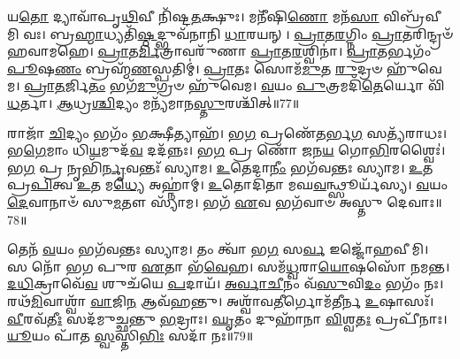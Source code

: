 𑌯\-\ul{𑌤𑍋} 𑌦𑍍𑌯𑌾𑌵𑌾᳴𑌪𑍃\-\ul{𑌥𑌿}\-𑌵𑍀 𑌨𑌿᳴𑌷𑍍𑌟\-\ul{𑌤}\-𑌕𑍍𑌷𑍁𑌃।
𑌮𑌨𑍀᳴𑌷𑌿\-\ul{𑌣𑍋} 𑌮𑌨᳴\-\ul{𑌸𑌾} 𑌵𑌿𑌬𑍍𑌰᳴𑌵𑍀𑌮𑌿 𑌵𑌃।
𑌬𑍍𑌰\-\ul{𑌹𑍍𑌮𑌾}\-𑌧𑍍𑌯𑌤𑌿᳴\-\ul{𑌷𑍍𑌠}\-𑌦𑍍𑌭𑍁𑌵᳴𑌨𑌾𑌨𑌿 \ul{𑌧𑌾}\-𑌰𑌯𑌨𑍍।
\-\ul{𑌪𑍍𑌰𑌾}\-𑌤\-\ul{𑌰}\-𑌗𑍍𑌨𑌿𑌂 \ul{𑌪𑍍𑌰𑌾}\-𑌤𑌰𑌿𑌨𑍍𑌦𑍍𑌰𑍞᳴ 𑌹𑌵𑌾𑌮𑌹𑍇।
\-\ul{𑌪𑍍𑌰𑌾}\-𑌤\-\ul{𑌰𑍍𑌮𑌿}\-𑌤𑍍𑌰𑌾𑌵𑌰𑍁᳴𑌣𑌾 \ul{𑌪𑍍𑌰𑌾}\-𑌤\-\ul{𑌰}\-𑌶𑍍𑌵𑌿𑌨𑌾॑।
\-\ul{𑌪𑍍𑌰𑌾}\-𑌤𑌰𑍍𑌭𑌗𑌂᳴ \ul{𑌪𑍂}\-𑌷\-\ul{𑌣𑌂} 𑌬𑍍𑌰𑌹𑍍𑌮᳴\-\ul{𑌣}\-𑌸𑍍𑌪𑌤𑌿𑌮𑍍॑।
\-\ul{𑌪𑍍𑌰𑌾}\-𑌤𑌃 𑌸𑍋𑌮᳴\-\ul{𑌮𑍁}\-𑌤 \ul{𑌰𑍁}\-𑌦𑍍𑌰𑍞 𑌹𑍁᳴𑌵𑍇𑌮।
\-\ul{𑌪𑍍𑌰𑌾}\-\-\ul{𑌤}\-𑌰𑍍𑌜𑌿\-\ul{𑌤𑌂} 𑌭𑌗᳴\-\ul{𑌮𑍁}\-𑌗𑍍𑌰𑍞 𑌹𑍁᳴𑌵𑍇𑌮।
\-\ul{𑌵}\-𑌯𑌂 \ul{𑌪𑍁}\-𑌤𑍍𑌰𑌮𑌦𑌿᳴\-\ul{𑌤𑍇}\-𑌰𑍍𑌯𑍋 𑌵𑌿᳴\-\ul{𑌧}\-𑌰𑍍𑌤𑌾।
\-\ul{𑌆}\-𑌧𑍍𑌰\-\ul{𑌶𑍍𑌚𑌿}\-𑌦𑍍𑌯𑌂 𑌮𑌨𑍍𑌯᳴𑌮𑌾𑌨\-\ul{𑌸𑍍𑌤𑍁}\-𑌰𑌶𑍍𑌚𑌿᳴𑌤𑍍॥77॥

𑌰𑌾𑌜𑌾᳴ \ul{𑌚𑌿}\-𑌦𑍍𑌯𑌂 𑌭𑌗𑌂᳴ \ul{𑌭}\-𑌕𑍍𑌷𑍀𑌤𑍍𑌯𑌾𑌹᳴।
𑌭\-\ul{𑌗} 𑌪𑍍𑌰𑌣𑍇᳴\-\ul{𑌤}\-𑌰𑍍𑌭\-\ul{𑌗} 𑌸𑌤𑍍𑌯᳴𑌰𑌾𑌧𑌃।
𑌭\-\ul{𑌗𑍇}\-𑌮𑌾𑌂 𑌧𑌿\-\ul{𑌯}\-𑌮𑍁𑌦᳴\-\ul{𑌵} 𑌦𑌦᳴𑌨𑍍𑌨𑌃।
𑌭\-\ul{𑌗} 𑌪𑍍𑌰 𑌣𑍋᳴ 𑌜𑌨\-\ul{𑌯} 𑌗𑍋\-\ul{𑌭𑌿}\-𑌰𑌶𑍍𑌵𑍈𑌃॑।
𑌭\-\ul{𑌗} 𑌪𑍍𑌰 𑌨𑍃𑌭𑌿᳴\-\ul{𑌰𑍍𑌨𑍃}\-𑌵𑌨𑍍𑌤𑌃᳴ 𑌸𑍍𑌯𑌾𑌮।
\-\ul{𑌉}\-𑌤𑍇𑌦𑌾\-\ul{𑌨𑍀𑌂} 𑌭𑌗᳴𑌵𑌨𑍍𑌤𑌃 𑌸𑍍𑌯𑌾𑌮।
\-\ul{𑌉}\-𑌤 𑌪𑍍𑌰\-\ul{𑌪𑌿}\-𑌤𑍍𑌵 \ul{𑌉}\-𑌤 𑌮\-\ul{𑌧𑍍𑌯𑍇} 𑌅𑌹𑍍𑌨𑌾॑𑌮𑍍।
\-\ul{𑌉}\-𑌤𑍋𑌦𑌿᳴𑌤𑌾 𑌮𑌘\-\ul{𑌵}\-𑌨𑍍𑌥𑍍𑌸𑍂𑌰𑍍𑌯᳴𑌸𑍍𑌯।
\-\ul{𑌵}\-𑌯𑌂 \ul{𑌦𑍇}\-𑌵𑌾𑌨𑌾𑍞᳴ 𑌸𑍁\-\ul{𑌮}\-𑌤𑍗 𑌸𑍍𑌯𑌾᳴𑌮।
𑌭𑌗᳴ \ul{𑌏}\-𑌵 𑌭𑌗᳴𑌵𑌾𑍞 𑌅𑌸𑍍𑌤𑍁 𑌦𑍇𑌵𑌾𑌃॥78॥

𑌤𑍇𑌨᳴ \ul{𑌵}\-𑌯𑌂 𑌭𑌗᳴𑌵𑌨𑍍𑌤𑌃 𑌸𑍍𑌯𑌾𑌮।
𑌤𑌂 𑌤𑍍𑌵𑌾᳴ 𑌭\-\ul{𑌗} 𑌸\-\ul{𑌰𑍍𑌵} 𑌇𑌜𑍍𑌜𑍋᳴𑌹𑌵𑍀𑌮𑌿।
𑌸 𑌨𑍋᳴ 𑌭𑌗 𑌪𑍁𑌰 \ul{𑌏}\-𑌤𑌾 𑌭᳴\-\ul{𑌵𑍇}\-𑌹।
𑌸𑌮᳴\-\ul{𑌧𑍍𑌵}\-𑌰𑌾\-\ul{𑌯𑍋}\-𑌷𑌸𑍋᳴ 𑌨𑌮𑌨𑍍𑌤।
\-\ul{𑌦}\-\-\ul{𑌧𑌿}\-𑌕𑍍𑌰𑌾𑌵𑍇᳴\-\ul{𑌵} 𑌶𑍁𑌚᳴𑌯𑍇 \ul{𑌪}\-𑌦𑌾𑌯᳴।
\-\ul{𑌅}\-\-\ul{𑌰𑍍𑌵𑌾}\-\-\ul{𑌚𑍀}\-𑌨𑌂 𑌵᳴\-\ul{𑌸𑍁}\-𑌵𑌿\-\ul{𑌦𑌂} 𑌭𑌗𑌂᳴ 𑌨𑌃।
𑌰𑌥᳴\-\ul{𑌮𑌿}\-𑌵𑌾𑌶𑍍𑌵𑌾᳴ \ul{𑌵𑌾}\-𑌜𑌿\-\ul{𑌨} 𑌆𑌵᳴𑌹𑌨𑍍𑌤𑍁।
𑌅𑌶𑍍𑌵𑌾᳴𑌵\-\ul{𑌤𑍀}\-𑌰𑍍𑌗𑍋𑌮᳴𑌤𑍀𑌰𑍍𑌨 \ul{𑌉}\-𑌷𑌾𑌸𑌃᳴।
\-\ul{𑌵𑍀}\-𑌰𑌵᳴\-\ul{𑌤𑍀𑌃} 𑌸𑌦᳴𑌮𑍁𑌚𑍍𑌛𑌨𑍍𑌤𑍁 \ul{𑌭}\-𑌦𑍍𑌰𑌾𑌃।
\-\ul{𑌘𑍃}\-𑌤𑌂 𑌦𑍁𑌹𑌾᳴𑌨𑌾 \ul{𑌵𑌿}\-𑌶𑍍𑌵\-\ul{𑌤𑌃} 𑌪𑍍𑌰𑌪𑍀᳴𑌨𑌾𑌃।
\-\ul{𑌯𑍂}\-𑌯𑌂 𑌪𑌾᳴𑌤 \ul{𑌸𑍍𑌵}\-𑌸𑍍𑌤𑌿\-\ul{𑌭𑌿𑌃} 𑌸𑌦𑌾᳴ 𑌨𑌃॥79॥\anuvakamend[\-\ul{𑌵𑌿}\-\-\ul{𑌚}\-\-\ul{𑌕𑍍𑌷}\-𑌣𑌾 𑌵𑌿᳴𑌚\-\ul{𑌰𑍍𑌤𑍁}\-𑌰𑍞 𑌶\-\ul{𑌰𑍍𑌮}\-𑌨𑍍𑌨𑌧𑌿᳴ \ul{𑌵𑌿}\-𑌸𑌰𑍍𑌜᳴𑌨𑌾\-\ul{𑌯} 𑌬𑍍𑌰\-\ul{𑌹𑍍𑌮} 𑌵\-\ul{𑌨𑌂} 𑌬𑍍𑌰\-\ul{𑌹𑍍𑌮} 𑌸 \ul{𑌵𑍃}\-𑌕𑍍𑌷 𑌆᳴𑌸𑍀\-\ul{𑌤𑍍𑌤𑍁}\-𑌰𑌶𑍍𑌚𑌿᳴𑌦𑍍𑌦𑍇\-\ul{𑌵𑌾𑌃} 𑌪𑍍𑌰𑌪𑍀᳴\-\ul{𑌨𑌾} 𑌏𑌕𑌂᳴ 𑌚]
\clearpage

